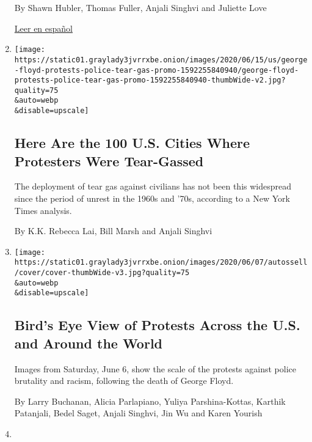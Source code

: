 \begin{enumerate}
  By Shawn Hubler, Thomas Fuller, Anjali Singhvi and Juliette Love

  \href{https://www.nytimes3xbfgragh.onion/es/2020/06/26/espanol/latinos-coronavirus.html}{Leer
  en español}
\item
  \href{/interactive/2020/06/16/us/george-floyd-protests-police-tear-gas.html}{}

  \texttt{[image: https://static01.graylady3jvrrxbe.onion/images/2020/06/15/us/george-floyd-protests-police-tear-gas-promo-1592255840940/george-floyd-protests-police-tear-gas-promo-1592255840940-thumbWide-v2.jpg?quality=75\\\&auto=webp\\\&disable=upscale]}

  \hypertarget{here-are-the-100-us-cities-where-protesters-were-tear-gassed}{%
  \subsection{Here Are the 100 U.S. Cities Where Protesters Were
  Tear-Gassed}\label{here-are-the-100-us-cities-where-protesters-were-tear-gassed}}

  The deployment of tear gas against civilians has not been this
  widespread since the period of unrest in the 1960s and '70s, according
  to a New York Times analysis.

  By K.K. Rebecca Lai, Bill Marsh and Anjali Singhvi
\item
  \href{/interactive/2020/06/07/us/george-floyd-protest-aerial-photos.html}{}

  \texttt{[image: https://static01.graylady3jvrrxbe.onion/images/2020/06/07/autossell/cover/cover-thumbWide-v3.jpg?quality=75\\\&auto=webp\\\&disable=upscale]}

  \hypertarget{birds-eye-view-of-protests-across-the-us-and-around-the-world}{%
  \subsection{Bird's Eye View of Protests Across the U.S. and Around the
  World}\label{birds-eye-view-of-protests-across-the-us-and-around-the-world}}

  Images from Saturday, June 6, show the scale of the protests against
  police brutality and racism, following the death of George Floyd.

  By Larry Buchanan, Alicia Parlapiano, Yuliya Parshina-Kottas, Karthik
  Patanjali, Bedel Saget, Anjali Singhvi, Jin Wu and Karen Yourish
\item
  \href{/interactive/2020/05/20/us/michigan-flooding-dam-risk.html}{}


\end{enumerate}
